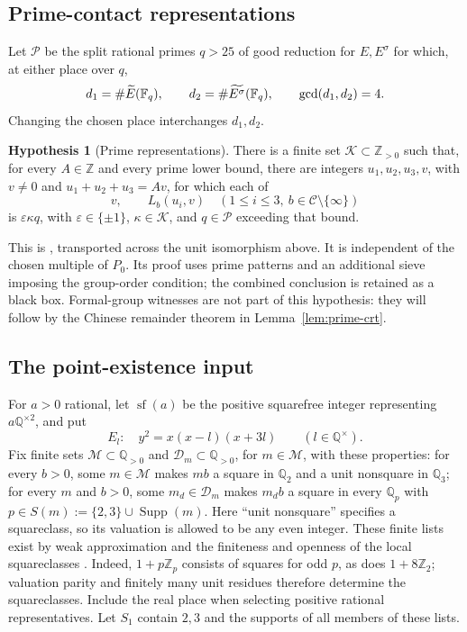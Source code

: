 \documentclass[11pt]{article}
\theoremstyle{definition}\newtheorem{inputthm}[theorem]{Hypothesis}
\theoremstyle{remark}\newtheorem{remark}[theorem]{Remark}
\newcommand{\Q}{\mathbb Q}\newcommand{\Z}{\mathbb Z}
\newcommand{\C}{\mathcal C}\newcommand{\Supp}{\operatorname{Supp}}
\begin{document}
\subsection{Prime-contact representations}

Let $\mathscr P$ be the split rational primes $q>25$ of good reduction
for $E,E^\sigma$ for which, at either place over $q$,
\[
 d_1=\#\widetilde E(\mathbb F_q),\qquad
 d_2=\#\widetilde{E^\sigma}(\mathbb F_q),\qquad \gcd(d_1,d_2)=4.
\]
Changing the chosen place interchanges $d_1,d_2$.

\begin{inputthm}[Prime representations]\label{in:prime-pattern}
There is a finite set $\mathcal K\subset\Z_{>0}$ such that, for every
$A\in\Z$ and every prime lower bound, there are integers $u_1,u_2,u_3,v$,
with $v\ne0$ and $u_1+u_2+u_3=Av$, for which each of
\begin{equation}\label{eq:thirteen}
 v,\qquad L_b(u_i,v)\quad
       (1\le i\le3,\ b\in\C\setminus\{\infty\})
\end{equation}
is $\varepsilon\kappa q$, with $\varepsilon\in\{\pm1\}$,
$\kappa\in\mathcal K$, and $q\in\mathscr P$ exceeding that bound.
\end{inputthm}

This is \cite[Lemma~6.1]{H10}, transported across the unit isomorphism
above. It is independent of the chosen multiple of $P_0$. Its proof
uses prime patterns and an additional sieve imposing the group-order
condition; the combined conclusion is retained as a black box.
Formal-group witnesses are not part of this hypothesis: they will
follow by the Chinese remainder theorem in Lemma~\ref{lem:prime-crt}.

\subsection{The point-existence input}

For $a>0$ rational, let $\operatorname{sf}(a)$ be the positive squarefree
integer representing $a\Q^{\times2}$, and put
\[
 E_l:\quad y^2=x(x-l)(x+3l)\qquad(l\in\Q^\times).
\]
Fix finite sets $\mathcal M\subset\Q_{>0}$ and
$\mathcal D_m\subset\Q_{>0}$, for $m\in\mathcal M$, with these properties:
for every $b>0$, some $m\in\mathcal M$ makes $mb$ a square in
$\Q_2$ and a unit nonsquare in $\Q_3$; for every $m$ and $b>0$,
some $m_d\in\mathcal D_m$ makes $m_db$ a square in every $\Q_p$
with $p\in S(m):=\{2,3\}\cup\Supp(m)$.
Here ``unit nonsquare'' specifies a squareclass, so its valuation is
allowed to be any even integer. These finite lists exist by weak
approximation and the finiteness and openness of the local squareclasses
\cite[Theorems~7.20 and~7.32]{MilneANT}.
Indeed, $1+p\Z_p$ consists of squares for odd $p$, as does
$1+8\Z_2$; valuation parity and finitely many unit residues therefore
determine the squareclasses. Include the real place when selecting
positive rational representatives. Let $S_1$ contain $2,3$ and the
supports of all members of these lists.
\end{document}
